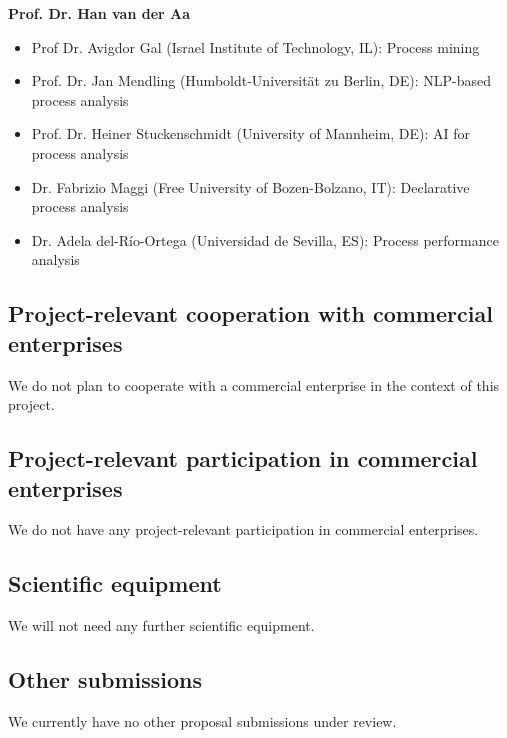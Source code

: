 \textbf{Prof. Dr. Han van der Aa}

\begin{itemize}
\item Prof Dr. Avigdor Gal (Israel Institute of Technology, IL): Process mining
\item Prof. Dr. Jan Mendling (Humboldt-Universit\"at zu Berlin, DE): NLP-based process analysis 
\item Prof. Dr. Heiner Stuckenschmidt (University of Mannheim, DE): AI for process analysis
\item Dr. Fabrizio Maggi (Free University of Bozen-Bolzano, IT): Declarative process analysis
\item Dr. Adela del-R\'{i}o-Ortega (Universidad de Sevilla, ES): Process performance analysis
\end{itemize}


\subsection{Project-relevant cooperation with commercial enterprises}

We do not plan to cooperate with a commercial enterprise in the context of this project. 


\subsection{Project-relevant participation in commercial enterprises}

We do not have any project-relevant participation in commercial enterprises.  

\subsection{Scientific equipment}

We will not need any further scientific equipment. 

\subsection{Other submissions}

We currently have no other proposal submissions under review.  